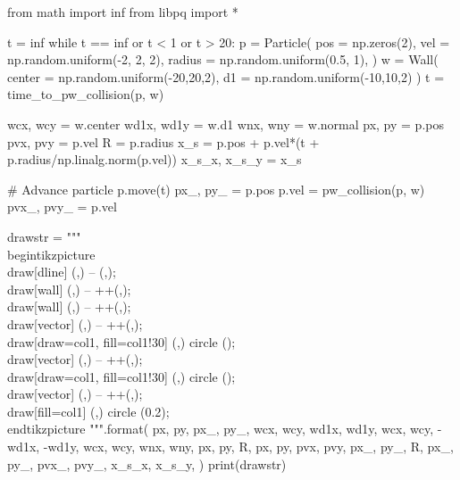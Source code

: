 \documentclass{standalone}
\begin{document}
\begin{pycode}
from math import inf
from libpq import *

t = inf
while t == inf or t < 1 or t > 20:
		p = Particle(
						pos = np.zeros(2),
						vel = np.random.uniform(-2, 2, 2),
						radius = np.random.uniform(0.5, 1),
						)
		w = Wall(
						center = np.random.uniform(-20,20,2),
						d1 = np.random.uniform(-10,10,2)
						)
		t = time_to_pw_collision(p, w)

wcx, wcy = w.center
wd1x, wd1y = w.d1
wnx, wny = w.normal
px, py = p.pos
pvx, pvy = p.vel
R = p.radius
x_s = p.pos + p.vel*(t + p.radius/np.linalg.norm(p.vel))
x_s_x, x_s_y = x_s

# Advance particle
p.move(t)
px_, py_ = p.pos
p.vel = pw_collision(p, w)
pvx_, pvy_ = p.vel

drawstr = """
\\begin{{tikzpicture}}
	\\draw[dline] ({},{}) -- ({},{});
	\\draw[wall] ({},{}) -- ++({},{});
	\\draw[wall] ({},{}) -- ++({},{});
	\\draw[vector] ({},{}) -- ++({},{});
	\\draw[draw=col1, fill=col1!30] ({},{}) circle ({});
	\\draw[vector] ({},{}) -- ++({},{});
	\\draw[draw=col1, fill=col1!30] ({},{}) circle ({});
	\\draw[vector] ({},{}) -- ++({},{});
	\\draw[fill=col1] ({},{}) circle (0.2);
\\end{{tikzpicture}}
""".format(
						px, py, px_, py_,
						wcx, wcy, wd1x, wd1y,
						wcx, wcy, -wd1x, -wd1y,
						wcx, wcy, wnx, wny,
						px, py, R,
						px, py, pvx, pvy,
						px_, py_, R,
						px_, py_, pvx_, pvy_,
						x_s_x, x_s_y,
					)
print(drawstr)
\end{pycode}
\end{document}
